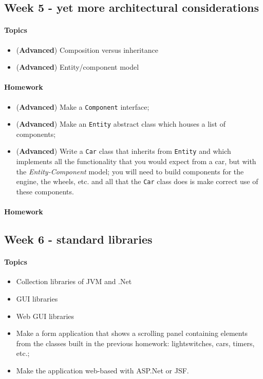 		\subsection{Week 5 - yet more architectural considerations}
		\paragraph*{Topics}			
		\begin{itemize}
			\item (\textbf{Advanced}) Composition versus inheritance
			\item (\textbf{Advanced}) Entity/component model
		\end{itemize}
		
		\paragraph*{Homework}
		\begin{itemize}
			\item (\textbf{Advanced}) Make a \texttt{Component} interface;
			\item (\textbf{Advanced}) Make an \texttt{Entity} abstract class which houses a list of components;
			\item (\textbf{Advanced}) Write a \texttt{Car} class that inherits from \texttt{Entity} and which implements all the functionality that you would expect from a car, but with the \textit{Entity-Component} model; you will need to build components for the engine, the wheels, etc. and all that the \texttt{Car} class does is make correct use of these components.
		\end{itemize}
		
		\paragraph*{Homework}
		\subsection{Week 6 - standard libraries}
		\paragraph*{Topics}			
		\begin{itemize}
			\item Collection libraries of JVM and .Net
			\item GUI libraries
			\item Web GUI libraries
		\end{itemize}
		
		\begin{itemize}
			\item Make a form application that shows a scrolling panel containing elements from the classes built in the previous homework: lightswitches, cars, timers, etc.;
			\item Make the application web-based with ASP.Net or JSF.
		\end{itemize}
